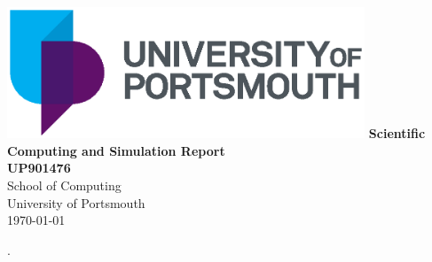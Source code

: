 \documentclass[12pt, a4paper]{report}
\begin{document}
\thispagestyle{empty}
\vspace*{1mm}
\vspace{15mm}
\begin{center}
\includegraphics[width=0.8\textwidth,center]{Figures/UoP_Master_Logo_Linear_PMS.eps}
\huge\textbf{\textsf{Scientific Computing and Simulation Report}}\\
\vspace{15mm}
\large \textbf{UP901476}
\vspace{15mm}
\normalsize \\ School of Computing \\ University of Portsmouth \\
\vspace{15mm}
\today
\end{center}


\renewcommand{\contentsname}{Table of Contents}
.
\tableofcontents


\newpage
{}
\listoffigures

\newpage
{}
\listoftables
\newpage
{}
{}





\newpage
{}
{}
\printbibliography

\appendix

\end{document}
